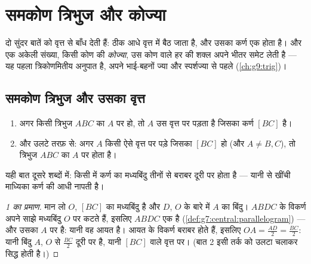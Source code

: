 \chapter{समकोण त्रिभुज और कोज्या}\label{ch:g8:cosine}

दो सुंदर बातें  को वृत्त से बाँध देती हैं:  ठीक आधे वृत्त में बैठ जाता है, और उसका कर्ण एक  होता
है। और एक अकेली संख्या, किसी कोण की \emph{कोज्या}, उस कोण वाले हर
 की शक्ल अपने भीतर समेट लेती है --- यह पहला
त्रिकोणमितीय अनुपात है, अपने भाई-बहनों ज्या और स्पर्शज्या से पहले
(\cref{ch:g9:trig})।

\section{समकोण त्रिभुज और उसका वृत्त}

\begin{theorem}[वृत्त प्रमेय]\label{thm:g8:cosine:circle}
\begin{enumerate}
  \item अगर किसी त्रिभुज $ABC$ का $A$ पर  हो, तो $A$ उस वृत्त
        पर पड़ता है जिसका  कर्ण $[BC]$ है।
  \item और उलटे तरफ़ से: अगर $A$ किसी ऐसे वृत्त पर पड़े जिसका 
        $[BC]$ हो (और $A \neq B, C$), तो त्रिभुज $ABC$ का $A$ पर
         होता है।
\end{enumerate}
यही बात दूसरे शब्दों में: किसी  में कर्ण का मध्यबिंदु
तीनों  से बराबर दूरी पर होता है --- यानी  से खींची
माध्यिका कर्ण की आधी नापती है।
\end{theorem}

\begin{proof}[1 का प्रमाण]
मान लो $O$, $[BC]$ का मध्यबिंदु है और $D$, $O$ के बारे में $A$ का
 बिंदु। $ABDC$ के विकर्ण अपने साझे मध्यबिंदु $O$ पर कटते हैं,
इसलिए $ABDC$ एक  है
(\cref{def:g7:central:parallelogram}) --- और उसका $A$ पर  है:
यानी वह आयत है। आयत के विकर्ण बराबर होते हैं, इसलिए
$OA = \frac{AD}{2} = \frac{BC}{2}$: यानी बिंदु $A$, $O$ से
$\frac{BC}{2}$ दूरी पर है, यानी  $[BC]$ वाले वृत्त पर। (बात 2
इसी तर्क को उलटा चलाकर सिद्ध होती है।)
\end{proof}


